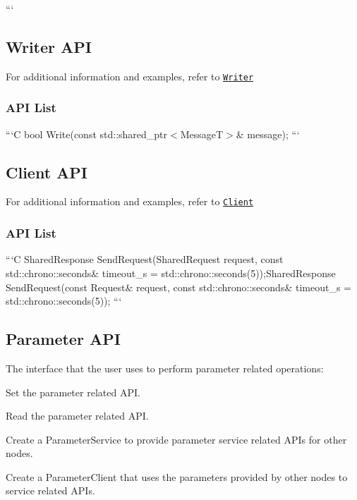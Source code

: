 {\ttfamily ```}

{\ttfamily \subsection*{Writer A\-P\-I}}

{\ttfamily  For additional information and examples, refer to \href{#writer}{\tt Writer}}

{\ttfamily \subsubsection*{A\-P\-I List}}

{\ttfamily }

{\ttfamily ```\-C bool Write(const std\-::shared\-\_\-ptr$<$\-Message\-T$>$\& message); ```}

{\ttfamily \subsection*{Client A\-P\-I}}

{\ttfamily  For additional information and examples, refer to \href{#service-creation-and-use}{\tt Client}}

{\ttfamily \subsubsection*{A\-P\-I List}}

{\ttfamily }

{\ttfamily ```\-C Shared\-Response Send\-Request(Shared\-Request request, const std\-::chrono\-::seconds\& timeout\-\_\-s = std\-::chrono\-::seconds(5));Shared\-Response Send\-Request(const Request\& request, const std\-::chrono\-::seconds\& timeout\-\_\-s = std\-::chrono\-::seconds(5)); ```}

{\ttfamily \subsection*{Parameter A\-P\-I}}

{\ttfamily }

{\ttfamily The interface that the user uses to perform parameter related operations\-:}

{\ttfamily 
\begin{DoxyItemize}
\item Set the parameter related A\-P\-I.
\item Read the parameter related A\-P\-I.
\item Create a Parameter\-Service to provide parameter service related A\-P\-Is for other nodes.
\item Create a Parameter\-Client that uses the parameters provided by other nodes to service related A\-P\-Is.
\end{DoxyItemize}}

